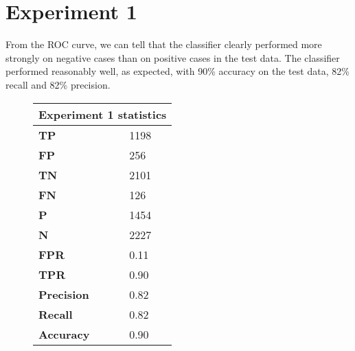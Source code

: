 \documentclass[titlepage,11pt]{article}
\begin{document}
\section[4]{Experiment 1} {

\vspace{2pt}\hspace{2pt}From the ROC curve, we can tell that the classifier clearly performed more strongly on negative cases than on positive cases in the test data. The classifier performed reasonably well, as expected, with 90\% accuracy on the test data, 82\% recall and 82\% precision.\\
\vspace{0.5pt}
\begin{figure}[h]
\begin{tabular}{|l|l|}
\hline
\multicolumn{2}{|c|}{\textbf{Experiment 1 statistics}} \\
\hline
\textbf{ TP } & 1198 \\
\textbf{ FP } & 256 \\
\textbf{ TN } & 2101 \\
\textbf{ FN } & 126 \\
\textbf{ P } &  1454 \\
\textbf{ N } & 2227 \\
\textbf{ FPR } & 0.11 \\
\textbf{ TPR } & 0.90 \\
\hline
\textbf{ Precision } & 0.82 \\
\textbf{ Recall    } & 0.82 \\
\textbf{ Accuracy  } & 0.90 \\
\hline
\end{tabular}
\end{figure}
    
}

\pagebreak
\end{document}

